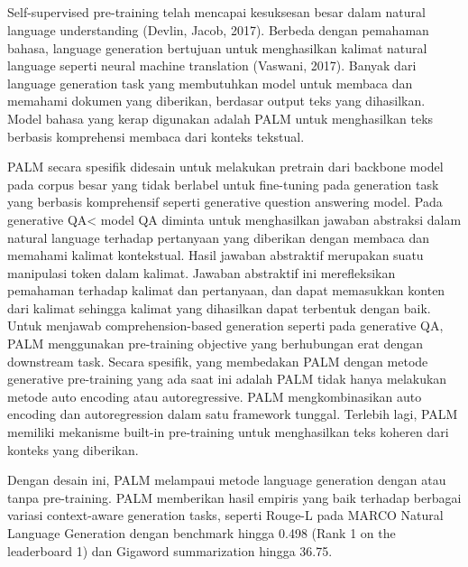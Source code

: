 \subsection{}

Self-supervised pre-training telah mencapai kesuksesan besar dalam natural language understanding (Devlin, Jacob, 2017).
Berbeda dengan pemahaman bahasa, language generation bertujuan untuk menghasilkan kalimat natural language  seperti neural machine translation (Vaswani, 2017).
Banyak dari language generation task yang membutuhkan model untuk membaca dan memahami dokumen yang diberikan, berdasar output teks yang dihasilkan.
Model bahasa yang kerap digunakan adalah \gls{PALM} untuk menghasilkan teks berbasis komprehensi membaca dari konteks tekstual.

\gls{PALM} secara spesifik didesain untuk melakukan pretrain dari backbone model pada corpus besar yang tidak berlabel untuk fine-tuning pada generation task yang berbasis komprehensif seperti generative question answering model.
Pada generative QA< model QA diminta untuk menghasilkan jawaban abstraksi dalam natural language terhadap pertanyaan yang diberikan dengan membaca dan memahami kalimat kontekstual.
Hasil jawaban abstraktif merupakan suatu manipulasi token dalam kalimat.
Jawaban abstraktif ini merefleksikan pemahaman terhadap kalimat dan pertanyaan, dan dapat memasukkan konten dari kalimat sehingga kalimat yang dihasilkan dapat terbentuk dengan baik.
Untuk menjawab comprehension-based generation seperti pada generative QA, \gls{PALM} menggunakan pre-training objective yang berhubungan erat dengan downstream task.
Secara spesifik, yang membedakan \gls{PALM} dengan metode generative pre-training yang ada saat ini adalah \gls{PALM} tidak hanya melakukan metode auto encoding atau autoregressive.
\gls{PALM} mengkombinasikan auto encoding dan autoregression dalam satu framework tunggal.
Terlebih lagi, \gls{PALM} memiliki mekanisme built-in pre-training untuk menghasilkan teks koheren dari konteks yang diberikan.

Dengan desain ini, \gls{PALM} melampaui metode language generation dengan atau tanpa pre-training.
\gls{PALM} memberikan hasil empiris yang baik terhadap berbagai variasi context-aware generation tasks, seperti Rouge-L pada MARCO Natural Language Generation dengan benchmark hingga 0.498 (Rank 1 on the leaderboard 1) dan Gigaword summarization hingga 36.75.
